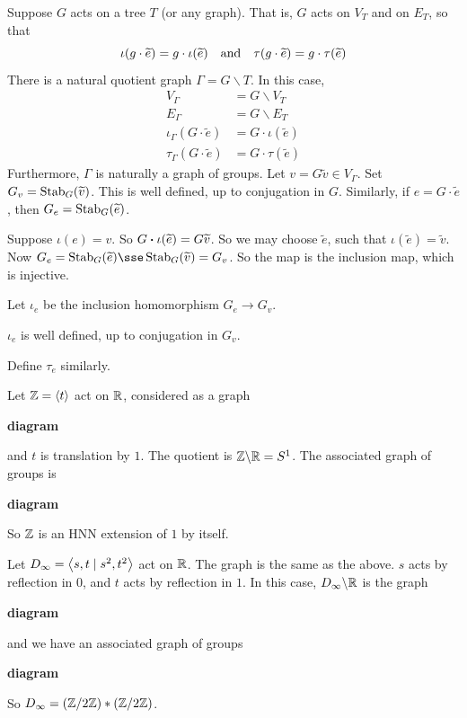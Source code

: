 \documentclass{article}
\begin{document}
Suppose \(G\) acts on a tree \(T\) (or any graph). That is, \(G\) acts on \(V_T\) and on \(E_T\), so that
\[\iota(g\cdot \widetilde e) = g\cdot \iota(\widetilde e) \qqtext{and}\tau(g\cdot \widetilde e) = g\cdot \tau(\widetilde e)\]
There is a natural quotient graph \(\Gamma = G \backslash T\). In this case,
\begin{align*}
    V_\Gamma &= G \backslash V_T \\
    E_\Gamma &= G \backslash E_T \\
    \iota_\Gamma(G\cdot \widetilde e) &= G\cdot \iota(\widetilde e) \\ 
    \tau_\Gamma(G\cdot \widetilde e) &= G\cdot \tau(\widetilde e)
\end{align*}
Furthermore, \(\Gamma\) is naturally a graph of groups. Let \(v = G\widetilde v \in V_\Gamma\). Set \(G_v = \operatorname{Stab}_G(\widetilde v)\). This is well defined, up to conjugation in \(G\). Similarly, if \(e = G \cdot \widetilde e\), then \(G_e = \operatorname{Stab}_G(\widetilde e)\).

Suppose \(\iota(e) = v\). So \(G \vdot \iota(\widetilde e) = G\widetilde v\). So we may choose \(\widetilde e\), such that \(\iota(\widetilde e) = \widetilde v\). Now \(G_e = \Stab_G(\widetilde e) \sse \Stab_G(\widetilde v) = G_v\). So the map is the inclusion map, which is injective.

Let \(\iota_e\) be the inclusion homomorphism \(G_e \to G_v\).

\begin{remark}
    \(\iota_e\) is well defined, up to conjugation in \(G_v\).
\end{remark}

Define \(\tau_e\) similarly.

\begin{example}
    Let \(\mathbb{Z} = \left\langle t \right\rangle\) act on \(\mathbb{R}\), considered as a graph

    \textbf{diagram}

    and \(t\) is translation by \(1\). The quotient is \(\mathbb{Z} \backslash \mathbb{R} = S^1\). The associated graph of groups is

    \textbf{diagram}

    So \(\mathbb{Z}\) is an HNN extension of \(1\) by itself.
\end{example}

\begin{example}
    Let \(D_\infty = \left\langle s, t \mid s^2, t^2 \right\rangle\) act on \(\mathbb{R}\). The graph is the same as the above. \(s\) acts by reflection in \(0\), and \(t\) acts by reflection in \(1\). In this case, \(D_\infty \backslash \mathbb{R}\) is the graph
    
    \textbf{diagram}

    and we have an associated graph of groups

    \textbf{diagram}

    So \(D_\infty = (\mathbb{Z}/2\mathbb{Z}) * (\mathbb{Z}/2\mathbb{Z})\).
\end{example}
\end{document}
